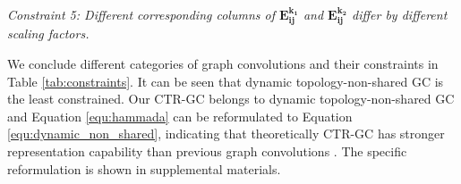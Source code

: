 \documentclass[10pt,twocolumn,letterpaper]{article}
\begin{document}
\noindent \textit{Constraint 5: Different corresponding columns of $\mathbf{E^{k_1}_{ij}}$ and $\mathbf{E^{k_2}_{ij}}$ differ by different scaling factors.}

\begin{table}
	\begin{center}
	\end{center}
	\vspace{-0.2cm}
	\caption{Constraints on different categories of graph convolutions and corresponding instances. The number 1-5 correspond to five constraints. {\color{red}Red}, {\color{green}Green} and {\color{blue}Blue} respectively indicate the relatively {\color{red}High}, {\color{green}Mid} and {\color{blue}Low} constraint strength.}
	\label{tab:constraints}
	\vspace{-0.3cm}
\end{table}

We conclude different categories of graph convolutions and their constraints in Table \ref{tab:constraints}. It can be seen that dynamic topology-non-shared GC is the least constrained. Our CTR-GC belongs to dynamic topology-non-shared GC and Equation \ref{equ:hammada} can be reformulated to Equation \ref{equ:dynamic_non_shared}, indicating that theoretically CTR-GC has stronger representation capability than previous graph convolutions \cite{cheng2020eccv,shi2019two,yan2018spatial, ye2020dynamic}. The specific reformulation is shown in supplemental materials.
\end{document}
